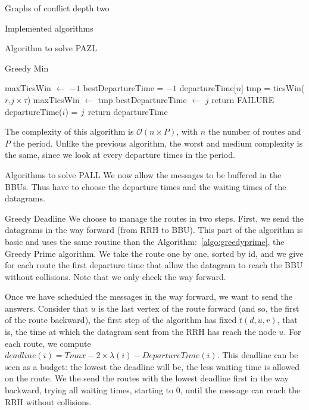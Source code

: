 \documentclass[10pt]{article}
\begin{document}
\begin{section}{Graphs of conflict depth two}
\begin{subsection}{Implemented algorithms}
\begin{subsubsection}{Algorithm to solve PAZL }
\begin{paragraph}{Greedy Min}
\begin{algorithm}[H]
\begin{algorithmic}
 	\FORALL{routes $i \in [0;n[$ }
	\STATE maxTicsWin $\leftarrow$ $-1$
	\STATE bestDepartureTime = $-1$
	\STATE departureTime[$n$]
	\FORALL{ offset $j \in [0;P[$ }
	\STATE tmp = ticsWin($r$,$j\times\tau$)
	\STATE maxTicsWin  $\leftarrow$ tmp
	\STATE bestDepartureTime  $\leftarrow$ $j$
	\ENDIF
 	\ENDFOR
	\STATE return FAILURE
	\ENDIF
	\STATE departureTime($i$) = $j\time\tau$
 	\ENDFOR
	\STATE return departureTime

 	\end{algorithmic}
 	\end{algorithm}
	
	The complexity of this algorithm is $\mathcal{O}(n\times P)$, with $n$ the number of routes and $P$ the period. Unlike the previous algorithm, the worst and medium complexity is the same, since we look at every departure times in the period.
\end{paragraph}
  \end{subsubsection}
    \begin{subsubsection}{Algorithms to solve PALL}
     We now allow the messages to be buffered in the BBUs. Thus have to choose the departure times and the waiting times of the datagrams.     
      \begin{paragraph}{Greedy Deadline}
      We choose to manage the routes in two steps.
      First, we send the datagrams in the way forward (from RRH to BBU).
      This part of the algorithm is basic and uses the same routine than the Algorithm:~\ref{algo:greedyprime}, the Greedy Prime algorithm. We take the route one by one, sorted by id, and we give for each route the first departure time that allow the datagram to reach the BBU without collisions. Note that we only check the way forward.
      
      Once we have scheduled the messages in the way forward, we want to send the answers. Consider that $u$ is the last vertex of the route forward (and so, the first of the route backward), the first step of the algorithm has fixed $t(d,u,r)$, that is, the time at which the datagram sent from the RRH has reach the node $u$. For each route, we compute $deadline(i) = Tmax - 2\times\lambda(i) - DepartureTime(i)$. This deadline can be seen as a budget: the lowest the deadline will be, the less waiting time is allowed on the route.\newline
      We the send the routes with the lowest deadline first in the way backward, trying all waiting times, starting to $0$, until the message can reach the RRH without collisions.
            

\end{paragraph}
\end{subsubsection}
\end{subsection}
\end{section}
\end{document}
